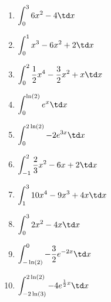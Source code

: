 \begin{Exercise}[title={\raggedright\normalfont Berechne die Werte, der in Aufgabe \ref{integralGrafisch1} abgeschätzen Integrale, exakt.}, label=integralRechnA1]\\
\end{Exercise}
\begin{Exercise}[title={\raggedright\normalfont Berechne die Werte der folgenden Integrale:}, label=integralRechnA2]\\
	\begin{minipage}{\textwidth}
		\begin{minipage}{.5\textwidth}
			\begin{enumerate}[label=\alph*)]
				\item \(\displaystyle\int_{0}^{3} 6x^2- 4\td x\)
				\item \(\displaystyle\int_{0}^{1} x^3-6x^2+2 \td x\)
				\item \(\displaystyle\int_{0}^{2} \frac{1}{2}x^4-\frac{3}{2}x^2+x \td x\)
				\item \(\displaystyle\int_{0}^{\ln(2)} e^x \td x\)
				\item \(\displaystyle\int_{0}^{2\ln(2)} -2e^{3x} \td x\)
			\end{enumerate}
		\end{minipage}
		\begin{minipage}{.5\textwidth}
			\begin{enumerate}[label=\alph*)]
				\setcounter{enumi}{5}
				\item \(\displaystyle\int_{-1}^{2} \frac{2}{3}x^2-6x+2 \td x\)
				\item \(\displaystyle\int_{1}^{3} 10x^4-9x^3+4x \td x\)
				\item \(\displaystyle\int_{0}^{3} 2x^2-4x \td x\)
				\item \(\displaystyle\int_{-\ln(2)}^{0} -\frac{3}{2}e^{-2x} \td x\)
				\item \(\displaystyle\int_{-2\ln(3)}^{2\ln(2)} -4e^{\frac{1}{2}x} \td x\)
			\end{enumerate}
		\end{minipage}
	\end{minipage}
	
\end{Exercise}
